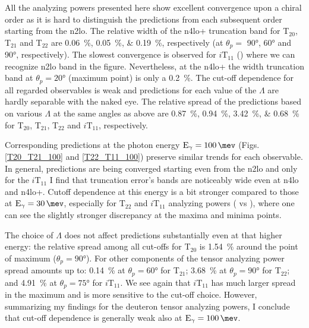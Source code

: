     All the analyzing powers presented here show excellent convergence 
    upon a chiral order as it is hard to distinguish the predictions
    from each subsequent order starting from the \gls{n2lo}.
    The relative width of the \gls{n4lo+} truncation band 
    for T$_{20}$, T$_{21}$ and T$_{22}$
    are \SIlist{0.06; 0.05; 0.19}{\percent}, respectively (at $\theta_p=$ \ang{90}, \ang{60} and \ang{90}, respectively).
    The slowest convergence is observed for $i\text{T}_{11}$ ()
    where we can recognize \gls{n2lo} band in the figure.
    Nevertheless, at the \gls{n4lo+}
    the width truncation band at $\theta_p = \ang{20}$ (maximum point)
    is only a \SI{0.2}{\percent}.
    The cut-off dependence for all regarded observables is weak and 
    predictions for each value of the $\Lambda$ are hardly separable 
    with the naked eye.
    The relative spread of the predictions based on various $\Lambda$ at the same angles as above 
    are \SIlist{0.87; 0.94; 3.42; 0.68}{\percent} for T$_{20}$, T$_{21}$, T$_{22}$ and $i\text{T}_{11}$, respectively.


    Corresponding predictions at the photon energy $\text{E}_\gamma = \SI{100}{\mev}$
    (Figs. \ref{T20_T21_100} and \ref{T22_T11_100}) preserve similar
    trends for each observable. 
    In general, predictions are being converged starting
    even from the \gls{n2lo} and only for the $i\text{T}_{11}$
    I find
    that truncation error's bands are noticeably wide
    even at \gls{n4lo} and \gls{n4lo+}.
    Cutoff dependence at this energy is a bit stronger
    compared to those at $\text{E}_\gamma = \SI{30}{\mev}$, especially
    for 
    $\text{T}_{22}$ and $i\text{T}_{11}$ analyzing powers ( vs ),
    where one can see 
    the slightly stronger discrepancy at the maxima and minima points.
    
    The choice of $\Lambda$ does not affect predictions substantially
    even at that higher energy:
    the relative spread among all cut-offs for T$_{20}$ is \SI{1.54}{\percent}
    around the point of maximum ($\theta_p = \ang{90}$).
    For other components of the tensor analyzing power spread amounts up to:
    \SI{0.14}{\percent} at $\theta_p = \ang{60}$ for T$_{21}$;
    \SI{3.68}{\percent} at $\theta_p = \ang{90}$ for T$_{22}$;
    and \SI{4.91}{\percent} at $\theta_p = \ang{75}$ for $i\text{T}_{11}$.
    We see again that $i\text{T}_{11}$ has much larger spread in the maximum and
    is more sensitive to the cut-off choice.
    However, summarizing my findings 
    for the deuteron tensor analyzing powers,
    I conclude that cut-off dependence is generally weak
    also at $\text{E}_\gamma = \SI{100}{\mev}$.

